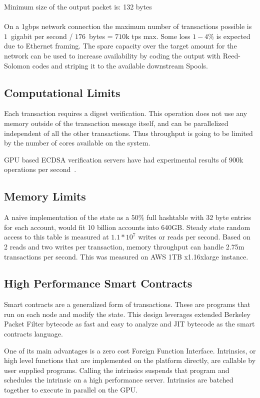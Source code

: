 \documentclass[12pt]{article}
\begin{document}
\noindent Minimum size of the output packet is: 132 bytes \\\\

On a 1gbps network connection the maximum number of transactions possible is $1$~gigabit per second / $176$~bytes = $710$k tps max. Some loss $1-4\%$ is expected due to Ethernet framing. The spare capacity over the target amount for the network can be used to increase availability by coding the output with Reed-Solomon codes and striping it to the available downstream Spools.
\subsection{Computational Limits}
Each transaction requires a digest verification. This operation does not use any memory outside of the transaction message itself, and can be parallelized independent of all the other transactions. Thus throughput is going to be limited by the number of cores available on the system.

GPU based ECDSA verification servers have had experimental results of 900k operations per second~\cite{gpuecc}.
\subsection{Memory Limits}
A naive implementation of the state as a \(50\%\) full hashtable with 32 byte entries for each account, would fit 10 billion accounts into 640GB. Steady state random access to this table is measured at \(1.1 * 10^7\) writes or reads per second. Based on 2 reads and two writes per transaction, memory throughput can handle 2.75m transactions per second. This was measured on AWS 1TB x1.16xlarge instance.

\subsection{High Performance Smart Contracts}\label{sec:smartcontracts}

Smart contracts are a generalized form of transactions. These are programs that run on each node and modify the state. This design leverages extended Berkeley Packet Filter bytecode as fast and easy to analyze and JIT bytecode as the smart contracts language.

One of its main advantages is a zero cost Foreign Function Interface. Intrinsics, or high level functions that are implemented on the platform directly, are callable by user supplied programs. Calling the intrinsics suspends that program and schedules the intrinsic on a high performance server. Intrinsics are batched together to execute in parallel on the GPU.
\end{document}

